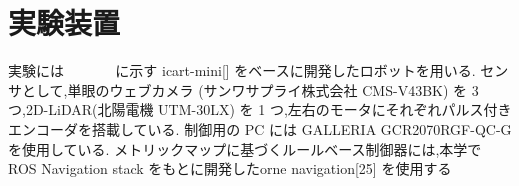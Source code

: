 \section{実験装置}
実験には ~~~~~~ に示す icart-mini[] をベースに開発したロボットを用いる.
センサとして,単眼のウェブカメラ (サンワサプライ株式会社 CMS-V43BK) を 3 つ,2D-LiDAR(北陽電機 UTM-30LX) を 1 つ,左右のモータにそれぞれパルス付きエンコーダを搭載している.
制御用の PC には GALLERIA GCR2070RGF-QC-G を使用している.
メトリックマップに基づくルールベース制御器には,本学で ROS Navigation stack をもとに開発したorne navigation[25] を使用する